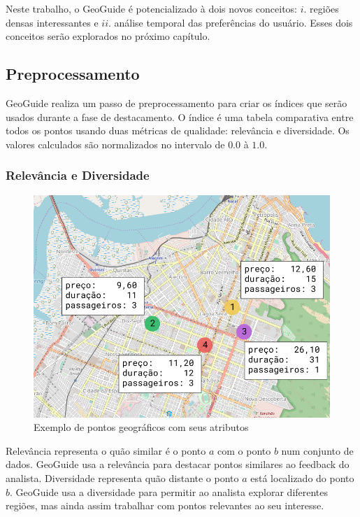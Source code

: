 Neste trabalho, o GeoGuide é potencializado à dois novos conceitos: $i$. regiões densas interessantes e $ii$. análise temporal das preferências do usuário. Esses dois conceitos serão explorados no próximo capítulo.

\subsection{Preprocessamento}

GeoGuide realiza um passo de preprocessamento para criar os índices que serão usados durante a fase de destacamento. O índice é uma tabela comparativa entre todos os pontos usando duas métricas de qualidade: relevância e diversidade. Os valores calculados são normalizados no intervalo de $0.0$ à $1.0$.

\subsubsection{Relevância e Diversidade}

\begin{figure}[t]
	\centering
	\includegraphics[width=\columnwidth]{imagens/exemplo-de-pontos}
	\caption{Exemplo de pontos geográficos com seus atributos}
	\label{fig:exemplo-pontos}
	\vspace{-10pt}
\end{figure}

Relevância representa o quão similar é o ponto $a$ com o ponto $b$ num conjunto de dados. GeoGuide usa a relevância para destacar pontos similares ao feedback do analista. Diversidade representa quão distante o ponto $a$ está localizado do ponto $b$. GeoGuide usa a diversidade para permitir ao analista explorar diferentes regiões, mas ainda assim trabalhar com pontos relevantes ao seu interesse.

